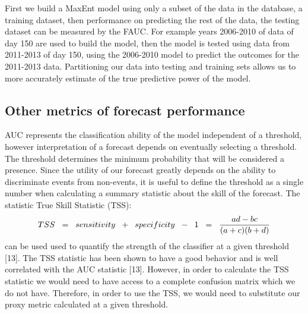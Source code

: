 First we build a MaxEnt model using only a subset of the data in the database, a training dataset, then performance on predicting the rest of the data, the testing dataset can be measured by the FAUC. For example years 2006-2010 of data of day 150 are used to build the model, then the model is tested using data from 2011-2013 of day 150, using the 2006-2010 model to predict the outcomes for the 2011-2013 data. Partitioning our data into testing and training sets allows us to more accurately estimate of the true predictive power of the model. 

\subsection{Other metrics of forecast performance}
\noindent AUC represents the classification ability of the model independent of a threshold, however interpretation of a forecast depends on eventually selecting a threshold. The threshold determines the minimum probability that will be considered a presence. Since the utility of our forecast greatly depends on the ability to discriminate events from non-events, it is useful to define the threshold as a single number when calculating a summary statistic about the skill of the forecast. The statistic True Skill Statistic (TSS):
\begin{equation}
TSS \hspace{0.2cm} = \hspace{0.2cm} sensitivity \hspace{0.2cm} + \hspace{0.2cm} specificity\hspace{0.2cm}  -\hspace{0.2cm} 1 \hspace{0.2cm} =  \hspace{0.2cm} \frac{ad -bc}{(a+c)(b+d)}
\end{equation}
can be used used to quantify the strength of the classifier at a given threshold [13]. The TSS statistic has been shown to have a good behavior and is well correlated with the AUC statistic [13]. However, in order to calculate the TSS statistic we would need to have access to a complete confusion matrix which we do not have. Therefore, in order to use the TSS, we would need to substitute our proxy metric calculated at a given threshold. \newline




